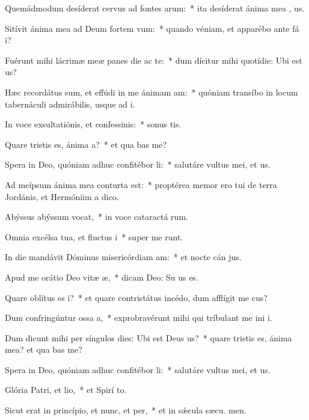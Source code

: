 \item Quemádmodum desíderat cervus ad fontes arum:~* ita desíderat ánima mea  , us.
\item Sitívit ánima mea ad Deum fortem vum:~* quando véniam, et apparébo ante fá i?
\item Fuérunt mihi lácrimæ meæ panes die ac te:~* dum dícitur mihi quotídie: Ubi est  us?
\item Hæc recordátus sum, et effúdi in me ánimam am:~* quóniam transíbo in locum tabernáculi admirábilis, usque ad  i.
\item In voce exsultatiónis, et confessinis:~* sonus tis.
\item Quare tristis es, ánima a?~* et qua bas me?
\item Spera in Deo, quóniam adhuc confitébor li:~* salutáre vultus mei, et  us.
\item Ad meípsum ánima mea conturta est:~* proptérea memor ero tui de terra Jordánis, et Hermóniim a  dico.
\item Abýssus abýssum vocat,~* in voce cataractá rum.
\item Omnia excélsa tua, et fluctus i~* super me runt.
\item In die mandávit Dóminus misericórdiam am:~* et nocte cán jus.
\item Apud me orátio Deo vitæ æ,~* dicam Deo: Su us es.
\item Quare oblítus es i?~* et quare contristátus incédo, dum afflígit me cus?
\item Dum confringúntur ossa a,~* exprobravérunt mihi qui tríbulant me ini i.
\item Dum dicunt mihi per síngulos dies: Ubi est Deus us?~* quare tristis es, ánima mea? et qua bas me?
\item Spera in Deo, quóniam adhuc confitébor li:~* salutáre vultus mei, et  us.
\item Glória Patri, et lio,~* et Spirí to.
\item Sicut erat in princípio, et nunc, et per,~* et in sǽcula sæcu. men.
